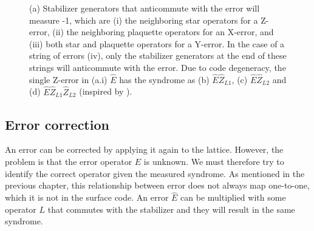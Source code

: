 \begin{figure}
  \hspace{1cm}
  \caption{(a) Stabilizer generators that anticommute with the error will measure -1, which are (i) the neighboring star operators for a Z-error, (ii) the neighboring plaquette operators for an X-error, and (iii) both star and plaquette operators for a Y-error. In the case of a string of errors (iv), only the stabilizer generators at the end of these strings will anticommute with the error. Due to code degeneracy, the single Z-error in (a.i) $\hat{E}$ has the syndrome as (b) $\hat{E}\hat{Z}_{L1}$, (c) $\hat{E}\hat{Z}_{L2}$ and (d) $\hat{E}\hat{Z}_{L1}\hat{Z}_{L2}$ (inspired by \cite{browne}).}\label{sf:fig_degenerate}
\end{figure}

\subsection{Error correction}
An error can be corrected by applying it again to the lattice. However, the problem is that the error operator $\hat{E}$ is unknown. We must therefore try to identify the correct operator given the measured syndrome. As mentioned in the previous chapter, this relationship between error does not always map one-to-one, which it is not in the surface code. An error $\hat{E}$ can be multiplied with some operator $L$ that commutes with the stabilizer and they will result in the same syndrome.

